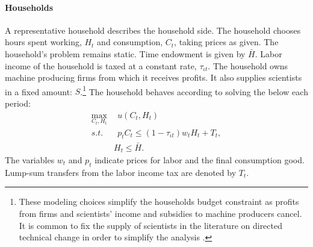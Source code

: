 \paragraph{Households}
A representative household describes the household side.
The household chooses hours spent working, $H_{t}$ and consumption, $C_t$, taking prices as given. The household's problem remains static. Time endowment is given by $\bar{H}$. %
Labor income of the household is taxed at a constant rate, $\tau_{\iota t}$. The household owns machine producing firms from which it receives profits. It also supplies scientists in a fixed amount: $S$.\footnote{These modeling choices simplify the households budget constraint as profits from firms and scientists' income and subsidies to machine producers cancel. It is common to fix the supply of scientists in the literature on directed technical change in order to simplify the analysis \citep{Acemoglu2012TheChange, Fried2018ClimateAnalysis}. }
The household behaves according to solving the below each period:
\begin{align*}
	\underset{C_{t}, H_{t}}{\max} & \ \
	u(C_{t},H_t)\\
	s.t.& \ \ p_{t}C_{t}\leq%
	(1-\tau_{\iota t})w_tH_t+T_t,\\
	\ &  H_{t}\leq \bar{H}.
\end{align*}
The variables $w_{t}$ and $p_{t}$ indicate prices for labor and the final consumption good. Lump-sum transfers from the labor income tax are denoted by $T_t$. 


